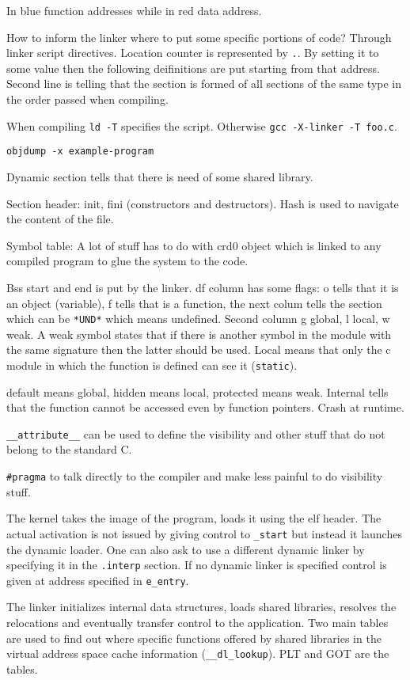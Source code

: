 \documentclass[twoside]{article}
\begin{document}
In blue function addresses while in red data address.

How to inform the linker where to put some specific portions of code? Through
linker script directives. Location counter is represented by \texttt{.}. By
setting it to some value then the following deifinitions are put starting from
that address. Second line is telling that the section is formed of all
sections of the same type in the order passed when compiling.

When compiling \texttt{ld -T} specifies the script. Otherwise \texttt{gcc
-X-linker -T foo.c}.

\texttt{objdump -x example-program}

Dynamic section tells that there is need of some shared library.

Section header: init, fini (constructors and destructors). Hash is used to
navigate the content of the file.

Symbol table: A lot of stuff has to do with crd0 object which is linked to any
compiled program to glue the system to the code.

Bss start and end is put by the linker. df column has some flags: o tells that
it is an object (variable), f tells that is a function, the next colum tells the
section which can be \texttt{*UND*} which means undefined. Second column
g global, l local, w weak. A weak symbol states that if there is another symbol
in the module with the same signature then the latter should be used. Local
means that only the c module in which the function is defined can see it
(\texttt{static}).


default means global, hidden means local, protected means weak. Internal tells
that the function cannot be accessed even by function pointers. Crash at
runtime.


\texttt{__attribute__} can be used to define the visibility and other stuff that
do not belong to the standard C.

\texttt{\#pragma} to talk directly to the compiler and make less painful to do
visibility stuff.


The kernel takes the image of the program, loads it using the elf header. The
actual activation is not issued by giving control to \texttt{_start} but instead
it launches the dynamic loader. One can also ask to use a different dynamic
linker by specifying it in the \texttt{.interp} section. If no dynamic linker is
specified control is given at address specified in \texttt{e_entry}.

The linker initializes internal data structures, loads shared libraries,
resolves the relocations and eventually transfer control to the application. Two
main tables are used to find out where specific functions offered by shared
libraries in the virtual address space cache information (\texttt{__dl_lookup}).
PLT and GOT are the tables.
\end{document}
